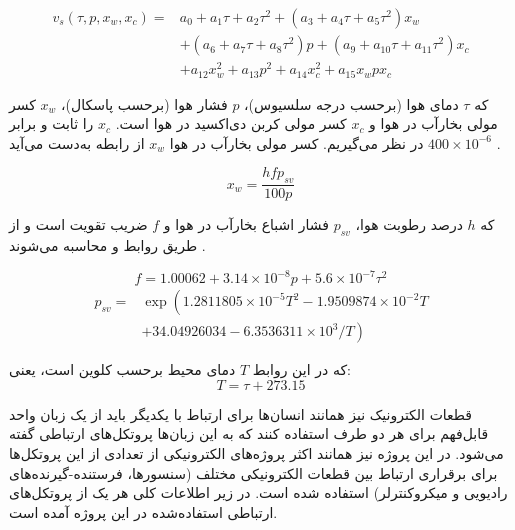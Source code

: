\begin{equation}\label{eq:soundSpeed}
	\begin{aligned}
		v_s\left(\tau, p, x_w, x_{c}\right)=& a_{0}+a_{1} \tau+a_{2} \tau^{2}+\left(a_{3}+a_{4} \tau+a_{5} \tau^{2}\right) x_{w} \\
		&+\left(a_{6}+a_{7} \tau+a_{8} \tau^{2}\right) p+\left(a_{9}+a_{10} \tau+a_{11} \tau^{2}\right) x_{c} \\
		&+a_{12} x_{w}^{2}+a_{13} p^{2}+a_{14} x_{c}^{2}+a_{15} x_w p x_c
	\end{aligned}
\end{equation}

که $\tau$ دمای هوا (برحسب درجه سلسیوس)، $p$ فشار هوا (برحسب پاسکال)، $x_w$ کسر مولی بخارآب در هوا و $x_c$ کسر مولی کربن دی‌اکسید در هوا است. $x_c$ را ثابت و برابر $400 \times 10^{-6}$ در نظر می‌گیریم. کسر مولی بخارآب در هوا $x_w$ از رابطه  به‌دست می‌آید . 

\begin{equation}\label{eq:x_w}
	x_w=\frac{h f p_{sv}}{100 p}
\end{equation}

که $h$ درصد رطوبت هوا، $p_{sv}$ فشار اشباع بخارآب در هوا و $f$ ضریب تقویت است و از طریق روابط  و  محاسبه می‌شوند .

\begin{equation}\label{eq:f}
	f=1.00062+3.14 \times 10^{-8} p+5.6 \times 10^{-7} \tau^{2}
\end{equation}
\begin{equation}\label{eq:p_sv}
	\begin{aligned}
		p_{s v}=& \exp \left(1.2811805 \times 10^{-5} T^{2}-1.9509874 \times 10^{-2} T\right.\\
		&\left.+34.04926034-6.3536311 \times 10^{3} / T\right)
	\end{aligned}
\end{equation}

که در این روابط $T$ دمای محیط برحسب کلوین است، یعنی:
\begin{equation}
	T = \tau + 273.15
\end{equation}


قطعات الکترونیک نیز همانند انسان‌ها برای ارتباط با یکدیگر باید از یک زبان واحد قابل‌فهم برای هر دو طرف استفاده کنند که به این زبان‌ها پروتکل‌های ارتباطی گفته می‌شود. در این پروژه نیز همانند اکثر پروژه‌های الکترونیکی از تعدادی از این پروتکل‌ها برای برقراری ارتباط بین قطعات الکترونیکی مختلف (سنسورها، فرستنده-گیرنده‌های رادیویی و میکروکنترلر) استفاده شده است. در زیر اطلاعات کلی هر یک از پروتکل‌های ارتباطی استفاده‌شده در این پروژه آمده است.

